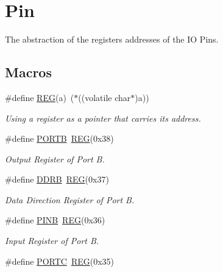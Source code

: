 \hypertarget{group__PINMCAL}{\section{Pin}
\label{group__PINMCAL}
}


The abstraction of the registers addresses of the I\+O Pins.  


\subsection*{Macros}
\begin{DoxyCompactItemize}
\item 
\#define \hyperlink{group__PINMCAL_ga72e45020e46f285689db51c46f273403}{R\+E\+G}(a)~($\ast$((volatile char$\ast$)a))
\begin{DoxyCompactList}\small\item\em Using a register as a pointer that carries its address. \end{DoxyCompactList}\item 
\hypertarget{group__PINMCAL_ga09a0c85cd3da09d9cdf63a5ac4c39f77}{\#define \hyperlink{group__PINMCAL_ga09a0c85cd3da09d9cdf63a5ac4c39f77}{P\+O\+R\+T\+B}~\hyperlink{group__WATCHDOGMCAL_ga72e45020e46f285689db51c46f273403}{R\+E\+G}(0x38)}\label{group__PINMCAL_ga09a0c85cd3da09d9cdf63a5ac4c39f77}

\begin{DoxyCompactList}\small\item\em Output Register of Port B. \end{DoxyCompactList}\item 
\hypertarget{group__PINMCAL_ga924a54df722121bc98383bdec5ae1898}{\#define \hyperlink{group__PINMCAL_ga924a54df722121bc98383bdec5ae1898}{D\+D\+R\+B}~\hyperlink{group__WATCHDOGMCAL_ga72e45020e46f285689db51c46f273403}{R\+E\+G}(0x37)}\label{group__PINMCAL_ga924a54df722121bc98383bdec5ae1898}

\begin{DoxyCompactList}\small\item\em Data Direction Register of Port B. \end{DoxyCompactList}\item 
\hypertarget{group__PINMCAL_ga49f0e8289e962c02128f24b94d7aea7c}{\#define \hyperlink{group__PINMCAL_ga49f0e8289e962c02128f24b94d7aea7c}{P\+I\+N\+B}~\hyperlink{group__WATCHDOGMCAL_ga72e45020e46f285689db51c46f273403}{R\+E\+G}(0x36)}\label{group__PINMCAL_ga49f0e8289e962c02128f24b94d7aea7c}

\begin{DoxyCompactList}\small\item\em Input Register of Port B. \end{DoxyCompactList}\item 
\hypertarget{group__PINMCAL_ga68fea88642279a70246e026e7221b0a5}{\#define \hyperlink{group__PINMCAL_ga68fea88642279a70246e026e7221b0a5}{P\+O\+R\+T\+C}~\hyperlink{group__WATCHDOGMCAL_ga72e45020e46f285689db51c46f273403}{R\+E\+G}(0x35)}\label{group__PINMCAL_ga68fea88642279a70246e026e7221b0a5}


\end{DoxyCompactItemize}
